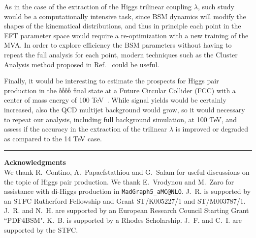 As in the case of the extraction of the Higgs
trilinear coupling $\lambda$, such study
would be a computationally intensive task, since
BSM dynamics will modify the shapes of the kinematical
distributions, and thus in principle each point in the EFT parameter
space would require a re-optimization with a new training
of the MVA.
%
In order to explore efficiency the BSM parameters
without having to repeat the full analysis
for each point, modern techniques
such as the Cluster Analysis method proposed
in Ref.~\cite{Dall'Osso:2015aia} could be useful.

Finally, it would be interesting to estimate the prospects for
Higgs pair production in the $b\bar{b}b\bar{b}$  final
state at a Future Circular
Collider (FCC) with a center of mass energy of
100 TeV~\cite{Barr:2014sga,Azatov:2015oxa,Papaefstathiou:2015iba}.
%
While signal yields would be certainly increased, also the QCD
multijet background would grow, so it would necessary to repeat
our analysis, including full background simulation, at 100 TeV,
and assess if the accuracy in the extraction of the trilinear $\lambda$
is improved or degraded as compared to the 14 TeV case.
%



\bigskip
\bigskip
\begin{center}
\rule{5cm}{.1pt}
\end{center}
\bigskip
\bigskip

{\bf\noindent  Acknowledgments \\}
We thank R.~Contino, A.~Papaefstathiou and
G.~Salam for useful discussions on the topic
of Higgs pair production.
%
We thank E.~Vrodynou and M.~Zaro for assistance with di-Higgs production
  in {\tt MadGraph5\_aMC@NLO}.
%
  J.~R. is supported by an STFC Rutherford Fellowship and
  Grant ST/K005227/1 and ST/M003787/1.
%
J.~R. and N.~H. are
supported by an European Research Council Starting Grant ``PDF4BSM".
%
K.~B. is supported by a Rhodes Scholarship.
%
J.~F. and C.~I. are supported by the STFC.
